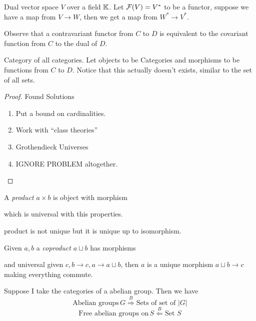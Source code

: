 \begin{example}
	Dual vector space $V$ over a field $\mathbb K$. Let $
	\mathcal F(V) = V^*$ to be a functor, suppose we have a map from $V \to W$, then we get a map from $W^* \to V^*$. 
\end{example}
\begin{remark}
	Observe that a contravariant functor from $C$ to $D$ is equivalent to the covariant function from $C$ to the dual of $D$.
\end{remark}
\begin{example}
	Category of all categories. Let objects to be Categories and morphisms to be functions from $C$ to $D$. Notice that this actually doesn't exists, similar to the set of all sets.
\end{example}
\begin{proof}
	Found Solutions
	\begin{enumerate}
		\item Put a bound on cardinalities.
		\item Work with ``class theories''
		\item Grothendieck Universes
		\item IGNORE PROBLEM altogether.
	\end{enumerate}
\end{proof} 
\begin{definition}
	A \textit{product} $a \times b$ is object with morphism 
	\begin{center}
	\end{center}
	which is universal with this properties.
\end{definition}
\begin{remark}
	product is not unique but it is unique up to isomorphism.
\end{remark}
\begin{definition}
	Given $a,b$ a \textit{coproduct} $a \sqcup b$ has morphisms
	\begin{center}
	\end{center}and universal
	given $c, b \to c, a \to a \sqcup b$, then $a$ is a unique morphism $a \sqcup b \to c$ making everything commute.
\end{definition}
\begin{example}
	Suppose I take the categories of a abelian group. Then we have
	\[ \text{Abelian groups} \,G \stackrel{B}{\Longrightarrow} \text{Sets of set of $|G|$}\]
	\[ \text{Free abelian groups on} \,S \stackrel{B}{\Longleftarrow} \text{Set $S$}\]
\end{example}

